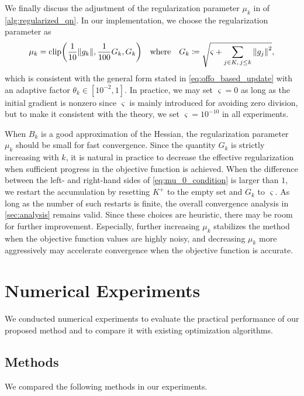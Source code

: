 \documentclass[journal]{subfiles}
\begin{document}
We finally discuss the adjustment of the regularization parameter $\mu_k$ in  of \cref{alg:regularized_qn}.
In our implementation, we choose the regularization parameter as
\begin{equation*}
    \mu_k = \mathrm{clip}\qty(\frac{1}{10}\norm{g_k}, \frac{1}{100} G_k, G_k) \quad \text{where} \quad G_k \coloneqq \sqrt{\varsigma + \sum_{j \in K, \, j \leq k} \norm{g_{j}}^2},
\end{equation*}
which is consistent with the general form stated in \cref{eq:offo_based_update} with an adaptive factor $\theta_k \in [10^{-2},1]$.
In practice, we may set $\varsigma=0$ as long as the initial gradient is nonzero since $\varsigma$ is mainly introduced for avoiding zero division, but to make it consistent with the theory, we set $\varsigma=10^{-10}$ in all experiments.

When $B_k$ is a good approximation of the Hessian, the regularization parameter $\mu_k$ should be small for fast convergence.
Since the quantity $G_k$ is strictly increasing with $k$, it is natural in practice to decrease the effective regularization when sufficient progress in the objective function is achieved.
When the difference between the left- and right-hand sides of \cref{eq:mu_0_condition} is larger than $1$, we restart the accumulation by resetting $K^+$ to the empty set and $G_k$ to $\varsigma$.
As long as the number of such restarts is finite, the overall convergence analysis in \cref{sec:analysis} remains valid.
Since these choices are heuristic, there may be room for further improvement. Especially, further increasing $\mu_k$ stabilizes the method when the objective function values are highly noisy, and decreasing $\mu_k$ more aggressively may accelerate convergence when the objective function is accurate.

\section{Numerical Experiments}\label{sec:experiments}

We conducted numerical experiments to evaluate the practical performance of our proposed method and to compare it with existing optimization algorithms.

\subsection{Methods}\label{sssec:methods}

We compared the following methods in our experiments.
\end{document}
